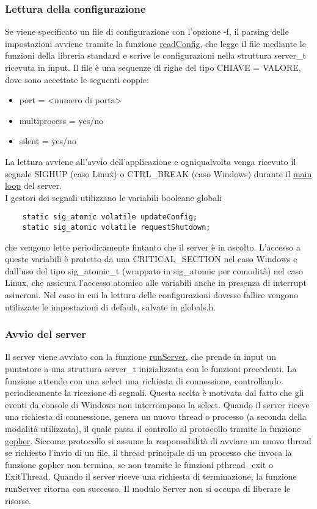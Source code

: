 \documentclass{article}
\begin{document}
\subsubsection{Lettura della configurazione}

Se viene specificato un file di configurazione con l'opzione -f, il parsing delle impostazioni avviene tramite la funzione \href{}
{readConfig}, che legge il file mediante le funzioni della libreria standard e scrive le configurazioni nella 
struttura server\_t ricevuta in input. Il file è una sequenze di righe del tipo CHIAVE = VALORE, dove sono accettate le seguenti coppie:
\begin{itemize}
    \item port = <numero di porta>
    \item multiprocess = yes/no
    \item silent = yes/no
\end{itemize}
La lettura avviene all'avvio dell'applicazione e ogniqualvolta venga ricevuto il segnale 
SIGHUP (caso Linux) o CTRL\_BREAK (caso Windows) durante il \href{}
{main loop} del server.\\
I gestori dei segnali utilizzano le variabili booleane globali
\begin{lstlisting}
    static sig_atomic volatile updateConfig;
    static sig_atomic volatile requestShutdown;
\end{lstlisting}
che vengono lette periodicamente fintanto che il server è in ascolto. L'accesso a queste variabili è 
protetto da una CRITICAL\_SECTION nel caso Windows e dall'uso del tipo sig\_atomic\_t (wrappato in sig\_atomic per comodità)
nel caso Linux, che assicura l'accesso atomico alle variabili anche in presenza di interrupt asincroni.
Nel caso in cui la lettura delle configurazioni dovesse fallire vengono utilizzate le 
impostazioni di default, salvate in globals.h.

\subsubsection{Avvio del server}

Il server viene avviato con la funzione \href{}{runServer},
che prende in input un puntatore a una struttura server\_t inizializzata con le funzioni precedenti.
La funzione attende con una select una richiesta di connessione, controllando periodicamente la ricezione
di segnali. Questa scelta è motivata dal fatto che gli eventi da console di Windows non interrompono la select.
Quando il server riceve una richiesta di connessione, genera un nuovo thread o processo (a seconda della modalità
utilizzata), il quale passa il controllo al protocollo tramite la funzione \href{}
{gopher}. Siccome protocollo si assume la responsabilità di avviare un nuovo thread se richiesto
l'invio di un file, il thread principale di un processo che invoca la funzione gopher non termina,
se non tramite le funzioni pthread\_exit o ExitThread. Quando il server riceve una richiesta di terminazione, 
la funzione runServer ritorna con successo. Il modulo Server non si occupa di liberare le risorse.
\end{document}
